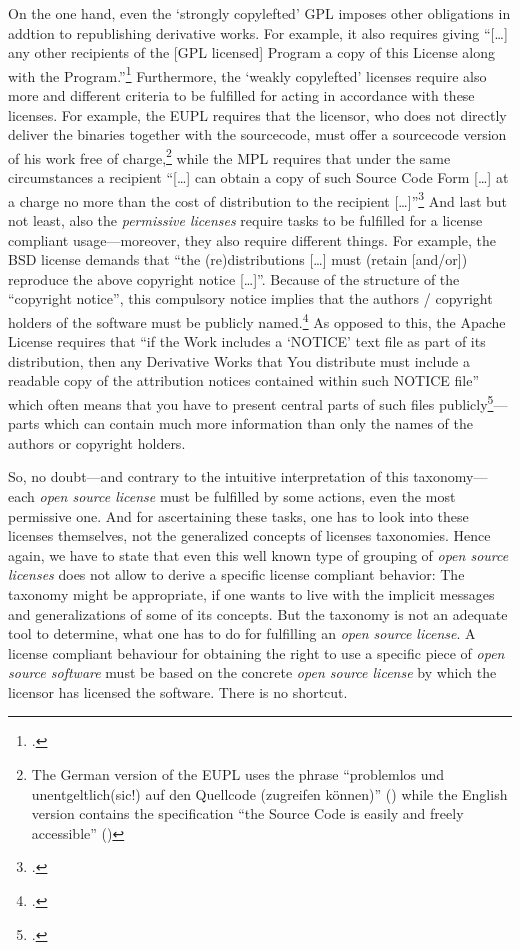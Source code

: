 On the one hand, even the `strongly copylefted' GPL imposes other obligations
in addtion to republishing derivative works. For example, it also requires
giving \enquote{[\ldots] any other recipients of the [GPL licensed] Program a
copy of this License along with the Program.}\footcite[cf.][\nopage wp.\
§1]{Gpl20OsiLicense1991a} Furthermore, the `weakly copylefted' licenses require
also more and different criteria to be fulfilled for acting in accordance with
these licenses. For example, the EUPL requires that the licensor, who does not
directly deliver the binaries together with the sourcecode, must offer a
sourcecode version of his work free of charge,\footnote{The German version of the
EUPL uses the phrase \enquote{problemlos und unentgeltlich(sic!) auf den
Quellcode (zugreifen können)} (\cite[cf.][3, section 3]{EuplLicense2007de})
while the English version contains the specification \enquote{the Source Code is
easily and freely accessible} (\cite[cf.][2, section 3]{EuplLicense2007en})}
while the MPL requires that under the same circumstances a recipient
\enquote{[\ldots] can obtain a copy of such Source Code Form [\ldots] at a
charge no more than the cost of distribution to the recipient
[\ldots]}\footcite[cf.][\nopage section 3.2.a]{Mpl20OsiLicense2013a}
And last but not least, also the \emph{permissive licenses} require tasks 
to be fulfilled for a license compliant usage---moreover, they also require
different things. For example, the BSD license demands that \enquote{the
(re)distributions [\ldots] must (retain [and/or]) reproduce the above copyright
notice [\ldots]}. Because of the structure of the \enquote{copyright notice},
this compulsory notice implies that the authors / copyright holders of the
software must be publicly named.\footcite[cf.][\nopage wp]{BsdLicense2Clause} As
opposed to this, the Apache License requires that \enquote{if the Work includes
a \enquote{NOTICE} text file as part of its distribution, then any Derivative Works that
You distribute must include a readable copy of the attribution notices contained
within such NOTICE file} which often means that you have to present central
parts of such files publicly\footcite[cf.][\nopage wp.\ section
4.4]{Apl20OsiLicense2004a}---parts which can contain much more information than
only the names of the authors or copyright holders.

So, no doubt---and contrary to the intuitive interpretation of this taxonomy---%
each \emph{open source license} must be fulfilled by some actions, even the most
permissive one. And for ascertaining these tasks, one has to look into these
licenses themselves, not the generalized concepts of licenses taxonomies. Hence
again, we have to state that even this well known type of grouping of \emph{open
source licenses} does not allow to derive a specific license compliant behavior:
The taxonomy might be appropriate, if one wants to live with the implicit
messages and generalizations of some of its concepts. But the taxonomy is not an
adequate tool to determine, what one has to do for fulfilling an \emph{open
source license}. A license compliant behaviour for obtaining the right to use a
specific piece of \emph{open source software} must be based on the concrete
\emph{open source license} by which the licensor has licensed the software.
There is no shortcut.

